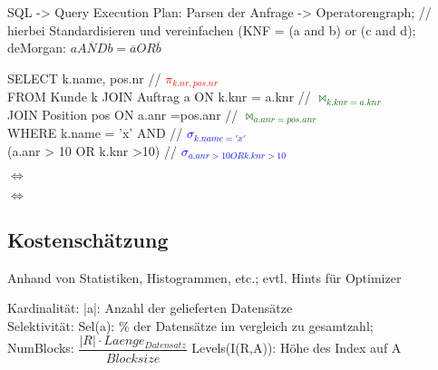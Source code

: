 SQL -> Query Execution Plan:
Parsen der Anfrage -> Operatorengraph; // hierbei Standardisieren und vereinfachen  (KNF = (a and b) or (c and d); deMorgan: $\overline{a AND b} = \overline{a} OR \overline{b}$

\newcommand{\proj}{\textcolor{red}{$\pi_{k.nr,pos.nr}$}}
\newcommand{\joink}{\textcolor{darkgreen}{$\bowtie_{k.knr = a.knr}$}}
\newcommand{\joina}{\textcolor{darkgreen}{$\bowtie_{a.anr = pos.anr}$}}
\newcommand{\selk}{\textcolor{blue}{$\sigma_{k.name = 'x'}$ }}
\newcommand{\selor}{\textcolor{blue}{$\sigma_{a.anr > 10 OR k.knr >10 }$}}
\newcommand{\grpi}[1]{\textcolor{gray}{ $\pi_{ #1 }$ }}

SELECT k.name, pos.nr  // \proj \\
FROM Kunde k JOIN Auftrag a ON k.knr = a.knr // \joink \\
JOIN Position pos ON a.anr =pos.anr // \joina \\
WHERE k.name = 'x' AND //  \selk \\
(a.anr > 10 OR k.knr >10) // \selor

 $\Leftrightarrow$
 
$\Leftrightarrow$

\subsection*{Kostenschätzung}
Anhand von Statistiken, Histogrammen, etc.; evtl. Hints für Optimizer

Kardinalität: |a|: Anzahl der gelieferten Datensätze \\
Selektivität: Sel(a): \% der Datensätze im vergleich zu gesamtzahl;\\
NumBlocks: $\dfrac{|R|\cdot Laenge_{Datensatz}}{Blocksize}$
Levels(I(R,A)): Höhe des Index auf A

